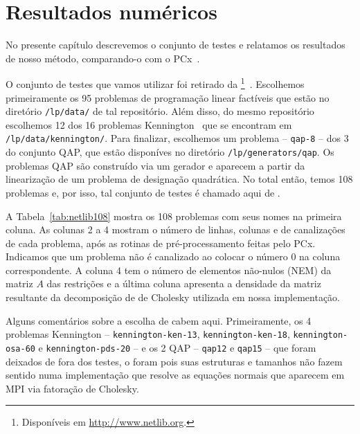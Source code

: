 

\chapter{Resultados numéricos}
\label{chap:numerical}



No presente capítulo descrevemos o conjunto de testes e relatamos os resultados de nosso método, comparando-o com o  PCx~\cite{Czyzyk:1999hk}.




O conjunto de testes que vamos utilizar foi retirado da \Netlib\footnote{Disponíveis em \url{http://www.netlib.org}.}~\cite{Dongarra:1987jk}. Escolhemos primeiramente os \num{95} problemas de programação linear factíveis que estão no diretório \verb|/lp/data/| de tal repositório.  Além disso, do mesmo repositório escolhemos \num{12} dos \num{16} problemas Kennington~\cite{Kennington:1990vo} que se encontram em \verb|/lp/data/kennington/|. Para finalizar, escolhemos um problema -- \texttt{qap-8} -- dos \num{3} do conjunto  QAP, que estão disponíves no diretório \verb|/lp/generators/qap|. Os problemas QAP são  construído via um gerador  e  aparecem a partir da linearização de um problema  de designação quadrática. No total então, temos 108 problemas e, por isso, tal conjunto de testes é chamado aqui de . 


A Tabela~\ref{tab:netlib108} mostra os \num{108} problemas com seus nomes na primeira coluna. As colunas 2 a 4 mostram o número de linhas, colunas e de canalizações de cada problema, após as rotinas de pré-processamento feitas pelo PCx. Indicamos que um problema  não é canalizado ao colocar o número \num{0} na coluna correspondente. A coluna 4 tem o número de elementos não-nulos (NEM) da matriz $A$ das restrições e a última coluna apresenta a densidade da matriz resultante da decomposição de de Cholesky utilizada em nossa implementação.


Alguns comentários sobre a escolha de  cabem aqui. Primeiramente, os \num{4} problemas  Kennington -- \texttt{kennington-ken-13}, \texttt{kennington-ken-18}, \texttt{ken\-ning\-ton-osa-60} e \texttt{ken\-ning\-ton-pds-20} --  e os \num{2} QAP -- \texttt{qap12} e \texttt{qap15} --  que foram deixados de fora dos testes, o foram pois suas estruturas e tamanhos não fazem sentido numa implementação que resolve as equações normais que aparecem em \ac{MPI} via fatoração de Cholesky. 


